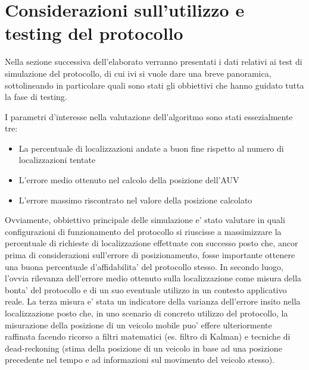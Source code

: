 \section{Considerazioni sull'utilizzo e testing del protocollo}
\par
Nella sezione successiva dell'elaborato verranno presentati i dati relativi ai test di simulazione del protocollo, di cui ivi si vuole dare una breve panoramica, sottolineando in particolare quali sono stati gli obbiettivi che hanno guidato tutta la fase di testing.
\par
I parametri d'interesse nella valutazione  dell'algoritmo sono stati essezialmente tre:
\begin{itemize}
\item La percentuale di localizzazioni andate a buon fine rispetto al numero di localizzazioni tentate
\item L'errore medio ottenuto nel calcolo della posizione dell'AUV
\item L'errore massimo riscontrato nel valore della posizione calcolato
\end{itemize}
Ovviamente, obbiettivo principale delle simulazione e' stato valutare in quali configurazioni di funzionamento del protocollo si riuscisse a massimizzare la percentuale di richieste di localizzazione effettuate con successo posto che, ancor prima di considerazioni sull'errore di posizionamento, fosse importante ottenere una buona percentuale d'affidabilita' del protocollo stesso.  In secondo luogo, l'ovvia rilevanza dell'errore medio ottenuto sulla localizzazione come misura della bonta' del protocollo e di un suo eventuale utilizzo in un contesto applicativo reale. La terza misura e' stata un indicatore della varianza dell'errore insito nella localizzazione posto che, in uno scenario di concreto utilizzo del protocollo, la misurazione della posizione di un veicolo mobile puo' effere ulteriormente raffinata facendo ricorso a filtri matematici (es. filtro di Kalman) e tecniche di dead-reckoning (stima della posizione  di un veicolo in base ad una posizione precedente nel tempo e ad informazioni sul movimento del veicolo stesso).

